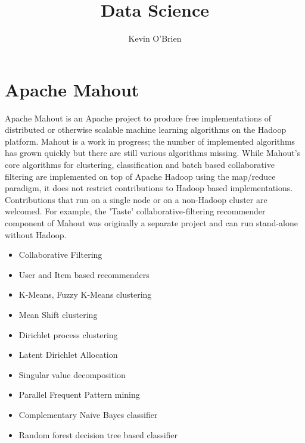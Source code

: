 \documentclass[12pt]{article}
\title{Data Science}
\author{Kevin O'Brien}
\begin{document}
\section*{Apache Mahout}
Apache Mahout is an Apache project to produce free implementations of distributed or otherwise scalable machine learning algorithms on the Hadoop platform. Mahout is a work in progress; the number of implemented algorithms has grown quickly but there are still various algorithms missing.
While Mahout's core algorithms for clustering, classification and batch based collaborative filtering are implemented on top of Apache Hadoop using the map/reduce paradigm, it does not restrict contributions to Hadoop based implementations. Contributions that run on a single node or on a non-Hadoop cluster are  welcomed. For example, the 'Taste' collaborative-filtering recommender component of Mahout was originally a separate project and can run stand-alone without Hadoop. 
\begin{itemize}	
\item	Collaborative Filtering
\item	User and Item based recommenders
\item	K-Means, Fuzzy K-Means clustering
\item	Mean Shift clustering
\item	Dirichlet process clustering
\item	Latent Dirichlet Allocation
\item	Singular value decomposition
\item	Parallel Frequent Pattern mining
\item	Complementary Naive Bayes classifier
\item	Random forest decision tree based classifier
\end{itemize}	
\end{document}
